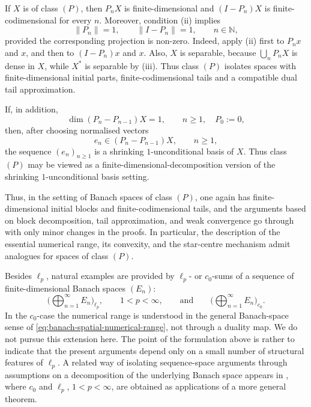 \documentclass[11pt]{amsart}
\numberwithin{equation}{section}
\theoremstyle{definition}
\theoremstyle{remark}
\begin{document}
If \(X\) is of class \((P)\), then \(P_nX\) is finite-dimensional and
\((I-P_n)X\) is finite-codimensional for every \(n\). Moreover,
condition \textup{(ii)} implies
\[
        \|P_n\|=1,\qquad \|I-P_n\|=1,
        \qquad n\in\mathbb N,
\]
provided the corresponding projection is non-zero. Indeed, apply
\textup{(ii)} first to \(P_nx\) and \(x\), and then to \((I-P_n)x\) and \(x\).
Also, \(X\) is separable, because \(\bigcup_n P_nX\) is dense in \(X\), while
\(X^*\) is separable by \textup{(iii)}. Thus class \((P)\) isolates spaces with
finite-dimensional initial parts, finite-codimensional tails and a compatible
dual tail approximation.

If, in addition,
\[
        \dim (P_n-P_{n-1})X=1,\qquad n\ge1,\quad P_0:=0,
\]
then, after choosing normalised vectors
\[
        e_n\in (P_n-P_{n-1})X,\qquad n\ge1,
\]
the sequence \((e_n)_{n\ge1}\) is a shrinking \(1\)-unconditional basis of
\(X\). Thus class \((P)\) may be viewed as a finite-dimensional-decomposition
version of the shrinking \(1\)-unconditional basis setting.



Thus, in the setting of Banach spaces of class \((P)\), one again has finite-dimensional initial blocks and
finite-codimensional tails, and the arguments based on block decomposition,
tail approximation, and weak convergence go through with only minor changes
in the proofs. In particular, the description of the essential numerical range, its convexity,
and the star-centre mechanism admit analogues for spaces of class \((P)\).

Besides \(\ell_p\), natural examples are provided by \(\ell_p\)- or \(c_0\)-sums of
a sequence of finite-dimensional Banach spaces $(E_n)$:
\[
        \Big(\bigoplus_{n=1}^\infty E_n\Big)_{\ell_p},
        \qquad 1<p<\infty,
        \qquad\text{and}\qquad
        \Big(\bigoplus_{n=1}^\infty E_n\Big)_{c_0}.
\]
In the \(c_0\)-case the numerical range is understood in the general Banach-space
sense of \eqref{eq:banach-spatial-numerical-range}, not through a duality map.
We do not pursue this extension here. The point of the formulation above is
rather to indicate that the present arguments depend only on a small number
of structural features of \(\ell_p\).
A related way of isolating sequence-space arguments through assumptions on a
decomposition of the underlying Banach space appears in \cite{H}, where
\(c_0\) and \(\ell_p\), \(1<p<\infty\), are obtained as applications of a more
general theorem.
\end{document}
